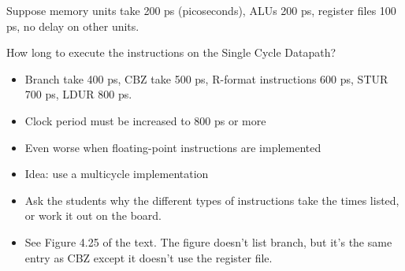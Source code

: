 

\begin{frame}[fragile]
\begin{tcolorbox}[enhanced,attach boxed title to top center={yshift=-3mm,yshifttext=-1mm},
  colback=red!5!white,colframe=red!75!black,colbacktitle=red!80!black,
  title=Try this,fonttitle=\bfseries,
  boxed title style={size=small,colframe=red!50!black} ]
Suppose memory units take 200 ps (picoseconds), ALUs 200 ps,
register files 100 ps, no delay on other units.

How long to execute the instructions on the Single Cycle Datapath?

  \end{tcolorbox}
\begin{itemize}

\item Branch take 400 ps, CBZ take 500 ps, R-format instructions 600 ps,
STUR 700 ps, LDUR 800 ps.
\item Clock period must be increased to 800 ps or more
\item Even worse when floating-point instructions are implemented
\item Idea: use a multicycle implementation
\end{itemize}
\BNotes\ifnum{}
\begin{itemize}
\item Ask the students why the different types of instructions take the
  times listed, or work it out on the board.
\item See Figure 4.25 of the text.  The figure doesn't list branch, but
  it's the same entry as CBZ except it doesn't use the register file.
  \end{itemize}
\fi\ENotes
\end{frame}





